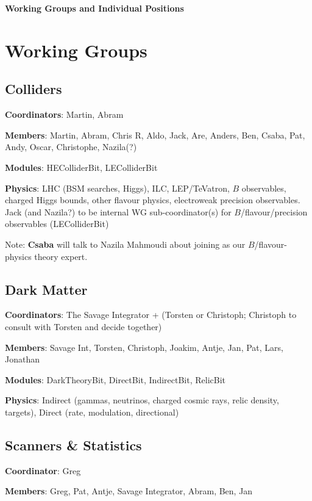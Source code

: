

\centerline{\textbf{Working Groups and Individual Positions}}\bigskip 


\section{Working Groups}

\subsection{Colliders}

\textbf{Coordinators}: Martin, Abram

\textbf{Members}: Martin, Abram, Chris R, Aldo, Jack, Are, Anders, Ben, Csaba, Pat, Andy, Oscar, Christophe, Nazila(?)

\textbf{Modules}: HEColliderBit, LEColliderBit

\textbf{Physics}: LHC (BSM searches, Higgs), ILC, LEP/TeVatron, $B$ observables, charged Higgs bounds, other flavour physics, electroweak precision observables.  Jack (and Nazila?) to be internal WG sub-coordinator(s) for $B$/flavour/precision observables (LEColliderBit)

Note: \textbf{Csaba} will talk to Nazila Mahmoudi about joining as our $B$/flavour-physics theory expert.


\subsection{Dark Matter}

\textbf{Coordinators}: The Savage Integrator + (Torsten or Christoph; Christoph to consult with Torsten and decide together)

\textbf{Members}: Savage Int, Torsten, Christoph, Joakim, Antje, Jan, Pat, Lars, Jonathan

\textbf{Modules}: DarkTheoryBit, DirectBit, IndirectBit, RelicBit

\textbf{Physics}: Indirect (gammas, neutrinos, charged cosmic rays, relic density, targets), Direct (rate, modulation, directional)


\subsection{Scanners \& Statistics}

\textbf{Coordinator}: Greg

\textbf{Members}: Greg, Pat, Antje, Savage Integrator, Abram, Ben, Jan

